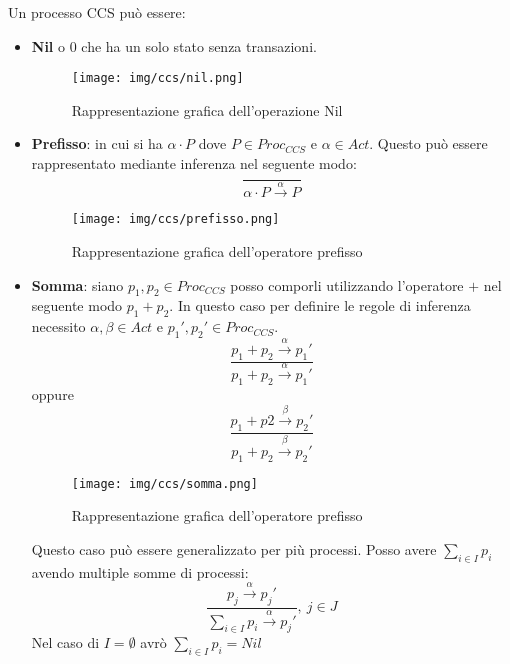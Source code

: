 Un processo CCS può essere:
\begin{itemize}
    \item \textbf{Nil} o 0 che ha un solo stato senza transazioni.
    \begin{figure}[!ht]
        \centering
        \texttt{[image: img/ccs/nil.png]}
        \caption{Rappresentazione grafica dell'operazione Nil}
    \end{figure}
    \item \textbf{Prefisso}: in cui si ha $\alpha \cdot P$ dove $P \in Proc_{CCS}$ e $\alpha \in Act$. Questo può essere rappresentato mediante inferenza nel seguente modo: $$\frac{}{\alpha \cdot P \xrightarrow{\alpha} P}$$
    \begin{figure}[!ht]
        \centering
        \texttt{[image: img/ccs/prefisso.png]}
        \caption{Rappresentazione grafica dell'operatore prefisso}
    \end{figure}
    \item \textbf{Somma}: siano $p_1, p_2 \in Proc_{CCS}$ posso comporli utilizzando l'operatore $+$ nel seguente modo $p_1 + p_2$. In questo caso per definire le regole di inferenza necessito $\alpha, \beta \in Act$ e $p_1', p_2' \in Proc_{CCS}$. $$\frac{p_1 + p_2 \xrightarrow{\alpha} p_1'}{p_1 + p_2 \xrightarrow{\alpha} p_1'}$$ oppure $$\frac{p_1 + p2 \xrightarrow{\beta} p_2'}{p_1 + p_2 \xrightarrow{\beta} p_2'}$$
    \begin{figure}[!ht]
        \centering
        \texttt{[image: img/ccs/somma.png]}
        \caption{Rappresentazione grafica dell'operatore prefisso}
    \end{figure}
    Questo caso può essere generalizzato per più processi. Posso avere $\sum_{i \in I} p_i$ avendo multiple somme di processi: $$\frac{p_j \xrightarrow{\alpha} p_j'}{\sum_{i \in I} p_i \xrightarrow{\alpha} p_j'}, \ j \in J$$ Nel caso di $I = \emptyset$ avrò $\sum_{i \in I} p_i = Nil$


\end{itemize}
